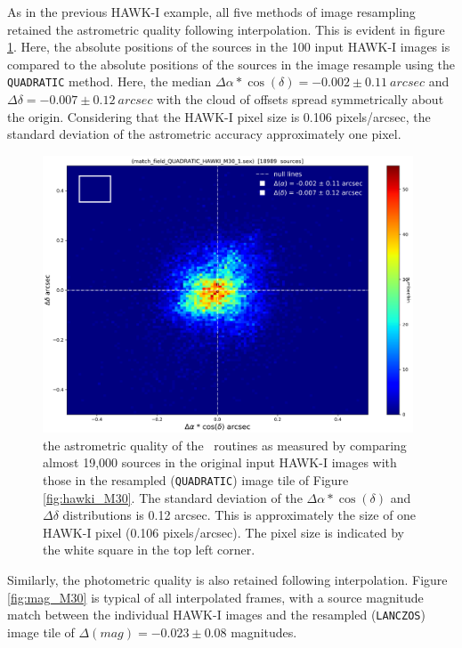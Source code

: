 As in the previous HAWK-I example, all five methods of image resampling retained the astrometric quality following interpolation.  This is evident in 
figure \ref{fig:radec_M30}.  Here, the absolute positions of the sources in the 100 input HAWK-I images is compared to the absolute positions
of the sources in the image resample using the {\tt QUADRATIC} method.   Here, the median $\Delta\alpha*\cos(\delta)=-0.002\pm0.11\ arcsec$ and 
$\Delta\delta=-0.007\pm0.12\ arcsec$ with the cloud of offsets spread symmetrically about the origin.  
Considering that the HAWK-I pixel size is 0.106 pixels/arcsec, the standard deviation of the astrometric accuracy approximately one pixel.

\begin{figure}[H]
\centering
\includegraphics[width=11cm]{figures/match_field_QUADRATIC_HAWKI_M30_1_RA_DEC_scatter_plot.png}
\caption[]
	{\footnotesize  the astrometric quality of the \hdrlresample\ routines as measured by comparing almost 19,000 sources in the original input HAWK-I images
	with those in the resampled ({\tt QUADRATIC}) image tile of Figure \ref{fig:hawki_M30}.
	The standard deviation of the $\Delta\alpha*\cos(\delta)$ and $\Delta\delta$ distributions is 0.12 arcsec. This is approximately the size of one HAWK-I
	pixel (0.106 pixels/arcsec).  The pixel size is indicated by the white square in the top left corner.
	}
	\label{fig:radec_M30}
\end{figure}

Similarly, the photometric quality is also retained following interpolation.   Figure \ref{fig:mag_M30} is typical of all interpolated frames, with a source magnitude match 
between the individual HAWK-I images and the resampled ({\tt LANCZOS}) image tile of $\Delta(mag)=-0.023\pm0.08$ magnitudes.

